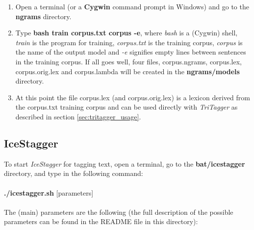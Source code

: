 \documentclass[11pt]{article}
\begin{document}
\begin{enumerate}
\item Open a terminal (or a \textbf{Cygwin} command prompt in Windows) and go to the \textbf{ngrams} directory.
\item Type {\bf bash train corpus.txt corpus -e}, where \emph{bash} is a (Cygwin) shell, \emph{train} is the program for training, \emph{corpus.txt} is the training corpus, \emph{corpus} is the name of the output model and \emph{-e} signifies empty lines between sentences in the training corpus.
If all goes well, four files, corpus.ngrams, corpus.lex, corpus.orig.lex and corpus.lambda will be created in the \textbf{ngrams/models} directory.
\item At this point the file corpus.lex (and corpus.orig.lex) is a lexicon derived from the corpus.txt training corpus and can be used directly with \emph{TriTagger} as described in section \ref{sec:tritagger_usage}.
\end{enumerate}

\subsection{IceStagger}
To start \emph{IceStagger} for tagging text, open a terminal, go to the \textbf{bat/icestagger} directory, and type in the following command:\\ \\
{\bf ./icestagger.sh} [parameters] \\ \\
The (main) parameters are the following (the full description of the possible parameters can be found in the README file in this directory):
\end{document}
